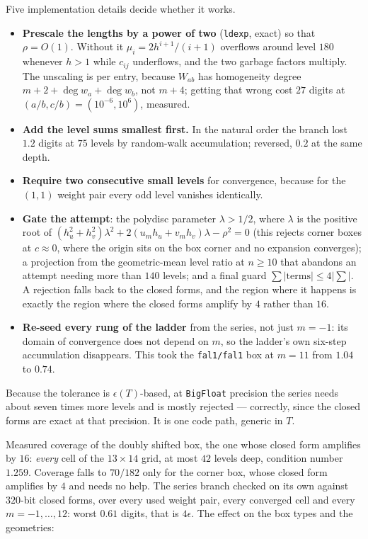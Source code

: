 \documentclass[11pt]{article}
\theoremstyle{remark}
\newcommand{\code}[1]{\texttt{#1}}
\begin{document}
Five implementation details decide whether it works.
\begin{itemize}[nosep]
\item \textbf{Prescale the lengths by a power of two} (\code{ldexp}, exact) so that
$\rho = O(1)$. Without it $\mu_i = 2h^{i+1}/(i+1)$ overflows around level $180$ whenever
$h > 1$ while $c_{ij}$ underflows, and the two garbage factors multiply. The unscaling is
per entry, because $W_{ab}$ has homogeneity degree $m+2+\deg w_a+\deg w_b$, not $m+4$;
getting that wrong cost $27$ digits at $(a/b,c/b) = (10^{-6},10^{6})$, measured.
\item \textbf{Add the level sums smallest first.} In the natural order the branch lost
$1.2$ digits at $75$ levels by random-walk accumulation; reversed, $0.2$ at the same depth.
\item \textbf{Require two consecutive small levels} for convergence, because for the
$(1,1)$ weight pair every odd level vanishes identically.
\item \textbf{Gate the attempt}: the polydisc parameter $\lambda > 1/2$, where $\lambda$ is
the positive root of $(h_u^2+h_v^2)\lambda^2 + 2(u_mh_u+v_mh_v)\lambda - \rho^2 = 0$
(this rejects corner boxes at $c\approx 0$, where the origin sits on the box corner and no
expansion converges); a projection from the geometric-mean level ratio at $n\ge 10$ that
abandons an attempt needing more than $140$ levels; and a final guard
$\sum|\mathrm{terms}| \le 4|\sum|$. A rejection falls back to the closed forms, and the
region where it happens is exactly the region where the closed forms amplify by $4$ rather
than $16$.
\item \textbf{Re-seed every rung of the ladder} from the series, not just $m = -1$: its
domain of convergence does not depend on $m$, so the ladder's own six-step accumulation
disappears. This took the \code{fal1/fal1} box at $m = 11$ from $1.04$ to $0.74$.
\end{itemize}
Because the tolerance is $\epsilon(T)$-based, at \code{BigFloat} precision the series needs
about seven times more levels and is mostly rejected --- correctly, since the closed forms
are exact at that precision. It is one code path, generic in $T$.

Measured coverage of the doubly shifted box, the one whose closed form amplifies by $16$:
\emph{every} cell of the $13\times14$ grid, at most $42$ levels deep, condition number
$1.259$. Coverage falls to $70/182$ only for the corner box, whose closed form amplifies by
$4$ and needs no help. The series branch checked on its own against $320$-bit closed forms,
over every used weight pair, every converged cell and every $m = -1,\ldots,12$: worst
$0.61$ digits, that is $4\epsilon$. The effect on the box types and the geometries:
\end{document}
